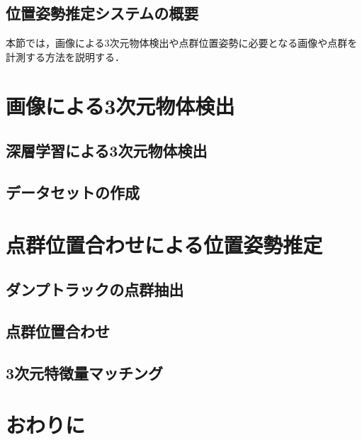 \subsection{位置姿勢推定システムの概要}
本節では，画像による3次元物体検出や点群位置姿勢に必要となる画像や点群を計測する方法を説明する．

\newpage
\section{画像による3次元物体検出}
\subsection{深層学習による3次元物体検出}
\newpage
\subsection{データセットの作成}

\section{点群位置合わせによる位置姿勢推定}
\subsection{ダンプトラックの点群抽出}
\subsection{点群位置合わせ}
\subsection{3次元特徴量マッチング}
\section{おわりに}
